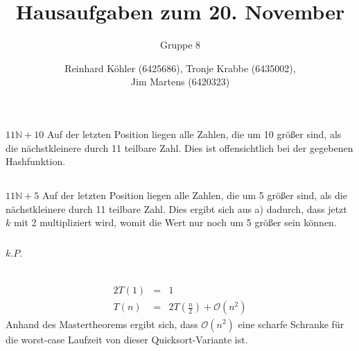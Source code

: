 \documentclass[10pt,a4paper,oneside,ngerman,numbers=noenddot]{scrartcl}
\begin{document}
\author{Reinhard Köhler (6425686), Tronje Krabbe (6435002), \\
Jim Martens (6420323)}
\title{Hausaufgaben zum 20. November}
\subtitle{Gruppe 8}
\maketitle
\section{} %
	\subsection{} %
		$11\mathbb{N}+10$
		Auf der letzten Position liegen alle Zahlen, die um 10 größer sind, als die nächstkleinere durch 11 teilbare Zahl. Dies ist offensichtlich bei der gegebenen Hashfunktion. 
	\subsection{} %
		$11\mathbb{N}+5$
		Auf der letzten Position liegen alle Zahlen, die um 5 größer sind, als die nächstkleinere durch 11 teilbare Zahl. Dies ergibt sich aus a) dadurch, dass jetzt $k$ mit 2 multipliziert wird, womit die Wert nur noch um 5 größer sein können.
	\subsection{} %
		$k.P.$
	\subsection{} %
\section{} %
	
\section{} %
	\subsection{} %
		\begin{alignat*}{2}
			T(1) &=& 1 \\
			T(n) &=& 2T\left(\frac{n}{2}\right) + \mathcal{O}(n^{2})
		\end{alignat*}
		Anhand des Mastertheorems ergibt sich, dass $\mathcal{O}(n^{2})$ eine scharfe Schranke für die worst-case Laufzeit von dieser Quicksort-Variante ist.
\end{document}
